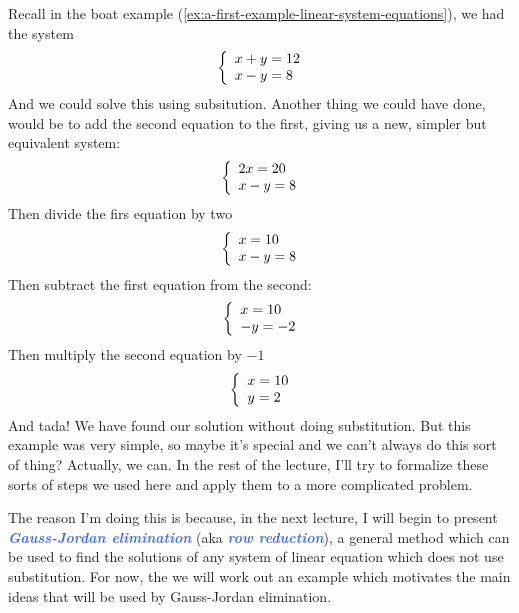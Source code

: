 \documentclass[10pt]{article}
\newcommand{\demph}[1]{\textcolor{RoyalBlue}{\textbf{\slshape #1}}} %
\theoremstyle{definition}
\begin{document}
Recall in the boat example (\cref{ex:a-first-example-linear-system-equations}),
we had the system
\begin{equation*}
  \left\{ \begin{array}{l@{}l} x+y=12 \\ x-y=8 \end{array}\right.
\end{equation*}
And we could solve this using subsitution. Another thing we could have done,
would be to add the second equation to the first, giving us a new, simpler but
equivalent system:
\begin{equation*}
  \left\{ \begin{array}{l@{}l} 2x=20 \\ x-y=8 \end{array}\right.
\end{equation*}
Then divide the firs equation by two
\begin{equation*}
  \left\{ \begin{array}{l@{}l} x=10 \\ x-y=8 \end{array}\right.
\end{equation*}
Then subtract the first equation from the second:
\begin{equation*}
  \left\{ \begin{array}{l@{}l} x=10 \\ -y=-2 \end{array}\right.
\end{equation*}
Then multiply the second equation by $-1$
\begin{equation*}
  \left\{ \begin{array}{l@{}l} x=10 \\ y=2 \end{array}\right.
\end{equation*}
And tada! We have found our solution without doing substitution. But this
example was very simple, so maybe it's special and we can't always do this
sort of thing? Actually, we can. In the rest of the lecture, I'll try to
formalize these sorts of steps we used here and apply them to a more
complicated problem.

The reason I'm doing this is because, in the next lecture, I will begin to
present \demph{Gauss-Jordan elimination} (aka \demph{row reduction}), a
general method which can be used to find the solutions of any system of linear
equation which does not use substitution. For now, the we will work out an
example which motivates the main ideas that will be used by Gauss-Jordan
elimination.
\end{document}
